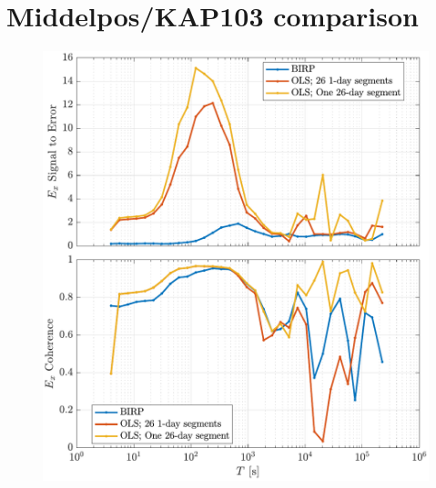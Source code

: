 \documentclass{article}
\begin{document}
\clearpage

\section{Middelpos/KAP103 comparison}

\begin{figure}[h!]
\centering
\includegraphics[width=\textwidth]{figures/KAP103_Middelpos/SN_compare-E_x.pdf}
\caption{}
\label{fig:universe}
\end{figure}
\end{document}
